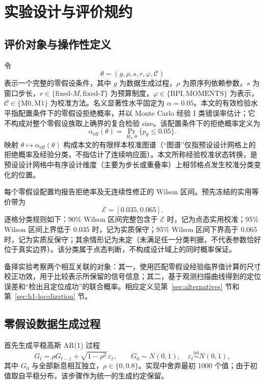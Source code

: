 \section{实验设计与评价规约}\label{sec:protocol}

\subsection{评价对象与操作性定义}\label{sec:estimands}\label{sec:rq}

令
\[
 \theta=(g,\rho,s,r,\varphi,\mathcal C)
\]
表示一个完整的零假设条件，其中 $g$ 为数据生成过程，$\rho$ 为原序列依赖参数，$s$ 为窗口步长，$r\in\{\mathrm{fixed}\text{-}M,\mathrm{fixed}\text{-}T\}$ 为预算制度，$\varphi\in\{\mathrm{BPI},\mathrm{MOMENTS}\}$ 为表示，$\mathcal C\in\{\mathrm{M0},\mathrm{M1}\}$ 为校准方法。名义显著性水平固定为 $\alpha=0.05$。本文的有效检验水平指配置条件下的零假设拒绝概率，并以 Monte Carlo 经验 I 类错误率估计；它不构成对整个零假设族取上确界的复合检验 size。该配置条件下的拒绝概率定义为
\begin{equation}\label{eq:effective-size}
 \alpha_{\mathrm{eff}}(\theta)
 =\Pr_{H_0,\theta}\{p_\theta\le0.05\}.
\end{equation}
映射 $\theta\mapsto\alpha_{\mathrm{eff}}(\theta)$ 构成本文的有限样本校准图谱（“图谱”仅指预设设计网格上的拒绝概率及经验分类，不指估计了连续响应面）。本文所称经验校准状态转换，是预设设计网格中有序设计维度（主要为步长或重叠率）上相邻格点发生校准分类变化的位置。

每个零假设配置均报告拒绝率及无连续性修正的 Wilson 区间\cite{Wilson1927}。预先冻结的实用等价带为
\[
 \mathcal E=[0.035,0.065].
\]
逐格分类规则如下：90\% Wilson 区间完整包含于 $\mathcal E$ 时，记为点态实用校准；95\% Wilson 区间上界低于 $0.035$ 时，记为实质保守；95\% Wilson 区间下界高于 $0.065$ 时，记为实质反保守；其余情形记为未定（未满足任一分类判据，不代表参数恰好位于真实边界）。该分类属于点态判断，不构成设计域上的同时概率保证。

备择实验考察两个相互关联的对象：其一，使用匹配零假设经验临界值计算的尺寸校正功效，用于比较表示所保留的信号信息；其二，基于观测扫描曲线得到的定位误差和“检出且定位成功”的联合概率。相应定义见第~\ref{sec:alternatives} 节和第~\ref{sec:h1-localization} 节。

\subsection{零假设数据生成过程}\label{sec:dgp}

首先生成平稳高斯 AR(1) 过程
\begin{equation}\label{eq:latent-ar}
 G_t=\rho G_{t-1}+\sqrt{1-\rho^2}\,\varepsilon_t,
 \qquad
 G_0\sim N(0,1),\quad
 \varepsilon_t\overset{\mathrm{iid}}{\sim}N(0,1),
\end{equation}
其中 $G_0$ 与全部新息相互独立，$\rho\in\{0,0.8\}$。实现中舍弃最初 1000 个值；由于初值取自平稳分布，该步骤作为统一的生成约定保留。

